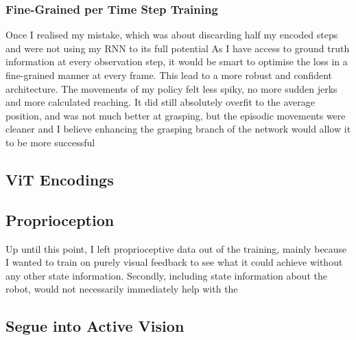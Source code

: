 \subsubsection{Fine-Grained per Time Step Training}
Once I realised my mistake, which was about discarding half my encoded steps and were not using my RNN to its full potential  As I have access to ground truth information at every observation step, it would be smart to optimise the loss in a fine-grained manner at every frame.
This lead to a more robust and confident architecture. The movements of my policy felt less spiky, no more sudden jerks and more calculated reaching. It did still absolutely overfit to the average position, and was not much better at grasping, but the episodic movements were cleaner and I believe enhancing the grasping branch of the network would allow it to be more successful 


\subsection{ViT Encodings}

\subsection{Proprioception}
Up until this point, I left proprioceptive data out of the training, mainly because I wanted to train on purely visual feedback to see what it could achieve without any other state information. Secondly, including state information about the robot, would not necessarily immediately help with the 

\subsection{Segue into Active Vision}



